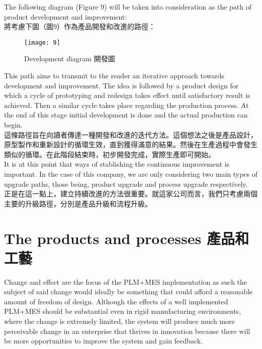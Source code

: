 \fontsize{14pt}{2.5pt}\sectionef 
{The following diagram (Figure 9) will be taken into consideration as the path of product development and improvement:}\\[10pt]

\fontsize{14pt}{5pt}\sectionef
 {將考慮下圖（圖9）作為產品開發和改進的路徑：}\\[15pt]

\begin{figure}[hbt!]
\begin{center}
\texttt{[image: 9]}
\caption{\Large Development diagram 開發圖}\label{fig.9}
\end{center}
\end{figure}

\fontsize{14pt}{2.5pt}\sectionef 
{This path aims to transmit to the reader an iterative approach towards development and improvement. The idea is followed by a product design for which a cycle of prototyping and redesign takes effect until satisfactory result is achieved. Then a similar cycle takes place regarding the production process. At the end of this stage initial development is done and the actual production can begin.}\\[10pt]

\fontsize{14pt}{5pt}\sectionef
 {這條路徑旨在向讀者傳達一種開發和改進的迭代方法。這個想法之後是產品設計，原型製作和重新設計的循環生效，直到獲得滿意的結果。然後在生產過程中會發生類似的循環。在此階段結束時，初步開發完成，實際生產即可開始。}\\[15pt]

\fontsize{14pt}{2.5pt}\sectionef 
{It is at this point that ways of stablishing the continuous improvement is important. In the case of this company, we are only considering two main types of upgrade paths, those being, product upgrade and process upgrade respectively.}\\[10pt]

\fontsize{14pt}{5pt}\sectionef
 {正是在這一點上，建立持續改進的方法很重要。就這家公司而言，我們只考慮兩個主要的升級路徑，分別是產品升級和流程升級。}\\[15pt]

\section{The products and processes 產品和工藝}

\fontsize{14pt}{2.5pt}\sectionef 
{Change and effect are the focus of the PLM+MES implementation as such the subject of said change would ideally be something that could afford a reasonable amount of freedom of design. Although the effects of a well implemented PLM+MES should be substantial even in rigid manufacturing environments, where the change is extremely limited, the system will produce much more perceivable change in an enterprise that thrives in innovation because there will be more opportunities to improve the system and gain feedback.}\\[10pt]

